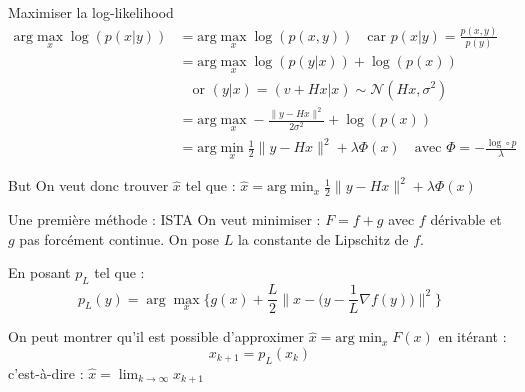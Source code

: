 \documentclass[11pt]{beamer}
\begin{document}
\begin{frame}{Maximiser la log-likelihood}
        \begin{align*}
            \text{arg} \max_x \log(p(x|y)) &= \text{arg} \max_x \log(p(x, y)) \quad \text{car } p(x|y) = \frac{p(x, y)}{p(y)} \\
            &= \text{arg} \max_x \log(p(y|x)) + \log(p(x)) \\
            &\quad \text{or } (y|x) = (v+Hx|x) \sim \mathcal{N}(Hx, \sigma^2) \\
            &= \text{arg} \max_x -\frac{\lVert y-Hx \rVert ^2}{2 \sigma^2} + \log(p(x)) \\
            &= \text{arg} \min_x \frac{1}{2}\lVert y-Hx \rVert ^2 + \lambda \Phi(x) \quad \text{avec } \Phi = -\frac{\log \circ p}{\lambda}
        \end{align*}

        \begin{alertblock}{But}
            On veut donc trouver $\hat{x}$ tel que : $\hat{x} = \text{arg} \displaystyle \min_x \frac{1}{2} \lVert y-Hx \rVert ^2 + \lambda \Phi(x)$
        \end{alertblock}
\end{frame}

\begin{frame}{Une première méthode : ISTA}
    On veut minimiser : $F = f + g$ avec $f$ dérivable et $g$ pas forcément continue.
    On pose $L$ la constante de Lipschitz de $f$.

    En posant $p_L$ tel que : $$ p_L(y) = \arg \max_x \Bigg\{ g(x) + \frac{L}{2} \Big\lVert x - \Big(y - \frac{1}{L} \nabla f(y)\Big) \Big\rVert ^2 \Bigg\}$$

    On peut montrer qu'il est possible d'approximer $\hat{x} = \text{arg} \displaystyle \min_x F(x)$ en itérant :
    $$x_{k+1} = p_L(x_k)$$
    c'est-à-dire : $\hat{x} = \displaystyle \lim_{k \rightarrow \infty} x_{k+1}$

\end{frame}
\end{document}
